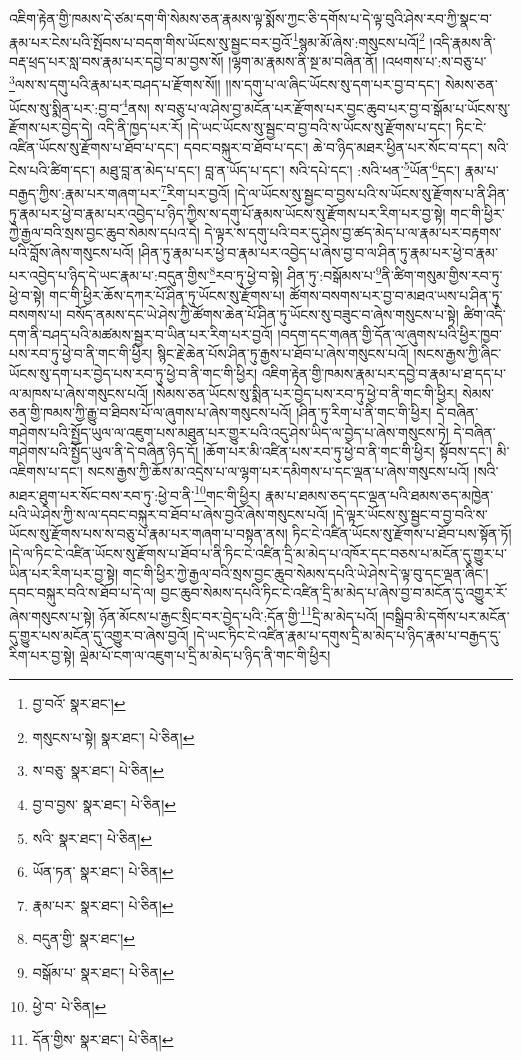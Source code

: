 འཇིག་རྟེན་གྱི་ཁམས་དེ་ཙམ་དག་གི་སེམས་ཅན་རྣམས་ལྟ་སྨོས་ཀྱང་ཅི་དགོས་པ་དེ་ལྟ་བུའི་ཤེས་རབ་ཀྱི་སྣང་བ་རྣམ་པར་ངེས་པའི་སྤོབས་པ་བདག་གིས་ཡོངས་སུ་སྦྱང་བར་བྱའོ་\footnote{བྱ་བའོ་  སྣར་ཐང་། }སྙམ་མོ་ཞེས་:གསུངས་པའོ།\footnote{གསུངས་པ་སྟེ།  སྣར་ཐང་།  པེ་ཅིན། } །འདི་རྣམས་ནི་བརྡ་ཕྲད་པར་སླ་བས་རྣམ་པར་དབྱེ་བ་མ་བྱས་སོ། །ལྷག་མ་རྣམས་ནི་སྔ་མ་བཞིན་ནོ། །འཕགས་པ་:ས་བཅུ་པ་\footnote{ས་བཅུ་  སྣར་ཐང་།  པེ་ཅིན། }ལས་ས་དགུ་པའི་རྣམ་པར་བཤད་པ་རྫོགས་སོ།། །།ས་དགུ་པ་ལ་ཞིང་ཡོངས་སུ་དག་པར་བྱ་བ་དང་། སེམས་ཅན་ཡོངས་སུ་སྨིན་པར་:བྱ་བ་\footnote{བྱ་བ་བྱས་  སྣར་ཐང་།  པེ་ཅིན། }ནས། ས་བཅུ་པ་ལ་ཤེས་བྱ་མངོན་པར་རྫོགས་པར་བྱང་ཆུབ་པར་བྱ་བ་སྒོམ་པ་ཡོངས་སུ་རྫོགས་པར་བྱེད་དེ། འདི་ནི་ཁྱད་པར་རོ། །དེ་ཡང་ཡོངས་སུ་སྦྱང་བ་བྱ་བའི་ས་ཡོངས་སུ་རྫོགས་པ་དང་། ཏིང་ངེ་འཛིན་ཡོངས་སུ་རྫོགས་པ་ཐོབ་པ་དང་། དབང་བསྐུར་བ་ཐོབ་པ་དང་། ཆེ་བ་ཉིད་མཐར་ཕྱིན་པར་སོང་བ་དང་། སའི་ངེས་པའི་ཚིག་དང་། མཐུ་བླ་ན་མེད་པ་དང་། བླ་ན་ཡོད་པ་དང་། སའི་དཔེ་དང་། :སའི་ཕན་\footnote{སའི་  སྣར་ཐང་།  པེ་ཅིན། }ཡོན་\footnote{ཡོན་ཏན་  སྣར་ཐང་།  པེ་ཅིན། }དང་། རྣམ་པ་བརྒྱད་ཀྱིས་:རྣམ་པར་གཞག་པར་\footnote{རྣམ་པར་  སྣར་ཐང་།  པེ་ཅིན། }རིག་པར་བྱའོ། །དེ་ལ་ཡོངས་སུ་སྦྱང་བ་བྱས་པའི་ས་ཡོངས་སུ་རྫོགས་པ་ནི་ཤིན་ཏུ་རྣམ་པར་ཕྱེ་བ་རྣམ་པར་འབྱེད་པ་ཉིད་ཀྱིས་ས་དགུ་པོ་རྣམས་ཡོངས་སུ་རྫོགས་པར་རིག་པར་བྱ་སྟེ། གང་གི་ཕྱིར་ཀྱེ་རྒྱལ་བའི་སྲས་བྱང་ཆུབ་སེམས་དཔའ་དེ། དེ་ལྟར་ས་དགུ་པའི་བར་དུ་ཤེས་བྱ་ཚད་མེད་པ་ལ་རྣམ་པར་བརྟགས་པའི་བློས་ཞེས་གསུངས་པའོ། །ཤིན་ཏུ་རྣམ་པར་ཕྱེ་བ་རྣམ་པར་འབྱེད་པ་ཞེས་བྱ་བ་ལ་ཤིན་ཏུ་རྣམ་པར་ཕྱེ་བ་རྣམ་པར་འབྱེད་པ་ཉིད་དེ་ཡང་རྣམ་པ་:བདུན་གྱིས་\footnote{བདུན་གྱི་  སྣར་ཐང་། }རབ་ཏུ་ཕྱེ་བ་སྟེ། ཤིན་ཏུ་:བསྒོམས་པ་\footnote{བསྒོམ་པ་  སྣར་ཐང་།  པེ་ཅིན། }ནི་ཚིག་གསུམ་གྱིས་རབ་ཏུ་ཕྱེ་བ་སྟེ། གང་གི་ཕྱིར་ཆོས་དཀར་པོ་ཤིན་ཏུ་ཡོངས་སུ་རྫོགས་པ། ཚོགས་བསགས་པར་བྱ་བ་མཐའ་ཡས་པ་ཤིན་ཏུ་བསགས་པ། བསོད་ནམས་དང་ཡེ་ཤེས་ཀྱི་ཚོགས་ཆེན་པོ་ཤིན་ཏུ་ཡོངས་སུ་བཟུང་བ་ཞེས་གསུངས་པ་སྟེ། ཚིག་འདི་དག་ནི་བཤད་པའི་མཚམས་སྦྱར་བ་ཡིན་པར་རིག་པར་བྱའོ། །བདག་དང་གཞན་གྱི་དོན་ལ་ཞུགས་པའི་ཕྱིར་ཁྱབ་པས་རབ་ཏུ་ཕྱེ་བ་ནི་གང་གི་ཕྱིར། སྙིང་རྗེ་ཆེན་པོས་ཤིན་ཏུ་རྒྱས་པ་ཐོབ་པ་ཞེས་གསུངས་པའོ། །སངས་རྒྱས་ཀྱི་ཞིང་ཡོངས་སུ་དག་པར་བྱེད་པས་རབ་ཏུ་ཕྱེ་བ་ནི་གང་གི་ཕྱིར། འཇིག་རྟེན་གྱི་ཁམས་རྣམ་པར་དབྱེ་བ་རྣམ་པ་ཐ་དད་པ་ལ་མཁས་པ་ཞེས་གསུངས་པའོ། །སེམས་ཅན་ཡོངས་སུ་སྨིན་པར་བྱེད་པས་རབ་ཏུ་ཕྱེ་བ་ནི་གང་གི་ཕྱིར། སེམས་ཅན་གྱི་ཁམས་ཀྱི་རྒྱུ་བ་ཐིབས་པོ་ལ་ཞུགས་པ་ཞེས་གསུངས་པའོ། །ཤིན་ཏུ་རིག་པ་ནི་གང་གི་ཕྱིར། དེ་བཞིན་གཤེགས་པའི་སྤྱོད་ཡུལ་ལ་འཇུག་པས་མཐུན་པར་གྱུར་པའི་འདུ་ཤེས་ཡིད་ལ་བྱེད་པ་ཞེས་གསུངས་ཏེ། དེ་བཞིན་གཤེགས་པའི་སྤྱོད་ཡུལ་ནི་དེ་བཞིན་ཉིད་དོ། །ཆོག་པར་མི་འཛིན་པས་རབ་ཏུ་ཕྱེ་བ་ནི་གང་གི་ཕྱིར། སྟོབས་དང་། མི་འཇིགས་པ་དང་། སངས་རྒྱས་ཀྱི་ཆོས་མ་འདྲེས་པ་ལ་ལྷག་པར་དམིགས་པ་དང་ལྡན་པ་ཞེས་གསུངས་པའོ། །སའི་མཐར་ཐུག་པར་སོང་བས་རབ་ཏུ་:ཕྱེ་བ་ནི་\footnote{ཕྱེ་བ་  པེ་ཅིན། }གང་གི་ཕྱིར། རྣམ་པ་ཐམས་ཅད་དང་ལྡན་པའི་ཐམས་ཅད་མཁྱེན་པའི་ཡེ་ཤེས་ཀྱི་ས་ལ་དབང་བསྐུར་བ་ཐོབ་པ་ཞེས་བྱའོ་ཞེས་གསུངས་པའོ། །དེ་ལྟར་ཡོངས་སུ་སྦྱང་བ་བྱ་བའི་ས་ཡོངས་སུ་རྫོགས་པས་ས་བཅུ་པ་རྣམ་པར་གཞག་པ་བསྟན་ནས། ཏིང་ངེ་འཛིན་ཡོངས་སུ་རྫོགས་པ་ཐོབ་པས་སྟོན་ཏོ། །དེ་ལ་ཏིང་ངེ་འཛིན་ཡོངས་སུ་རྫོགས་པ་ཐོབ་པ་ནི་ཏིང་ངེ་འཛིན་དྲི་མ་མེད་པ་འཁོར་དང་བཅས་པ་མངོན་དུ་གྱུར་པ་ཡིན་པར་རིག་པར་བྱ་སྟེ། གང་གི་ཕྱིར་ཀྱེ་རྒྱལ་བའི་སྲས་བྱང་ཆུབ་སེམས་དཔའི་ཡེ་ཤེས་དེ་ལྟ་བུ་དང་ལྡན་ཞིང་། དབང་བསྐུར་བའི་ས་ཐོབ་པ་དེ་ལ། བྱང་ཆུབ་སེམས་དཔའི་ཏིང་ངེ་འཛིན་དྲི་མ་མེད་པ་ཞེས་བྱ་བ་མངོན་དུ་འགྱུར་རོ་ཞེས་གསུངས་པ་སྟེ། ཉོན་མོངས་པ་རྒྱང་སྲིང་བར་བྱེད་པའི་:དོན་གྱི་\footnote{དོན་གྱིས་  སྣར་ཐང་།  པེ་ཅིན། }དྲི་མ་མེད་པའོ། །བསྒྲིབ་མི་དགོས་པར་མངོན་དུ་གྱུར་པས་མངོན་དུ་འགྱུར་བ་ཞེས་བྱའོ། །དེ་ཡང་ཏིང་ངེ་འཛིན་རྣམ་པ་དགུས་དྲི་མ་མེད་པ་ཉིད་རྣམ་པ་བརྒྱད་དུ་རིག་པར་བྱ་སྟེ། ལྡེམ་པོ་ངག་ལ་འཇུག་པ་དྲི་མ་མེད་པ་ཉིད་ནི་གང་གི་ཕྱིར། 